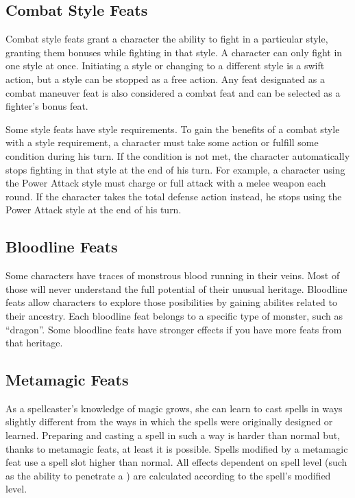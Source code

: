 \subsection{Combat Style Feats}
Combat style feats grant a character the ability to fight in a particular style, granting them bonuses while fighting in that style. A character can only fight in one style at once. Initiating a style or changing to a different style is a swift action, but a style can be stopped as a free action. Any feat designated as a combat maneuver feat is also considered a combat feat and can be selected as a fighter's bonus feat.

Some style feats have style requirements. To gain the benefits of a combat style with a style requirement, a character must take some action or fulfill some condition during his turn. If the condition is not met, the character automatically stops fighting in that style at the end of his turn. For example, a character using the Power Attack style must charge or full attack with a melee weapon each round. If the character takes the total defense action instead, he stops using the Power Attack style at the end of his turn.

\subsection{Bloodline Feats}

Some characters have traces of monstrous blood running in their veins. Most of those will never understand the full potential of their unusual heritage. Bloodline feats allow characters to explore those posibilities by gaining abilites related to their ancestry. Each bloodline feat belongs to a specific type of monster, such as ``dragon''. Some bloodline feats have stronger effects if you have more feats from that heritage.

\subsection{Metamagic Feats}
As a spellcaster's knowledge of magic grows, she can learn to cast spells in ways slightly different from the ways in which the spells were originally designed or learned. Preparing and casting a spell in such a way is harder than normal but, thanks to metamagic feats, at least it is possible. Spells modified by a metamagic feat use a spell slot higher than normal. All effects dependent on spell level (such as the ability to penetrate a ) are calculated according to the spell's modified level.

